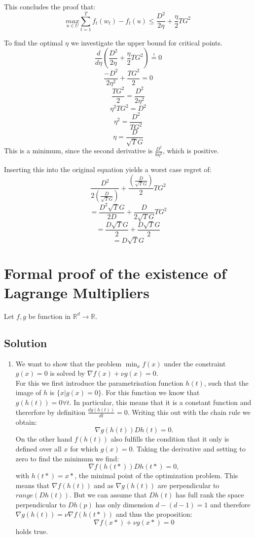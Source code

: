 \documentclass[10pt]{article}
\numberwithin{equation}{section}
\begin{document}
\begin{enumerate}
{This concludes the proof that:
$$\underset{u \in U}{max} \sum_{t=1}^T f_t(w_t) - f_t(u) \leq  \frac{D^2}{2\eta} + \frac{\eta}{2} T G^2$$

\item[d)]{
    To find the optimal $\eta$ we investigate the upper bound for critical points.
    $$ \frac{d}{d \eta} \left( \frac{D^2}{2\eta} + \frac{\eta}{2} T G^2\right)  \overset{!}{=} 0$$
    $$\frac{-D^2}{2\eta^2} + \frac{TG^2}{2} = 0 $$
    $$\frac{TG^2}{2} = \frac{D^2}{2\eta^2}  $$
    $$\eta^2TG^2 = D^2$$
    $$\eta^2 = \frac{D^2}{TG^2}$$
    $$\eta = \frac{D}{\sqrt{T}G}$$
    This is a minimum, since the second derivative is $\frac{D^2}{6\eta^3}$, which is positive.

    Inserting this into the original equation yields a worst case regret of:
    $$\frac{D^2}{2\left(\frac{D}{\sqrt{T}{G}}\right)} + \frac{\left(\frac{D}{\sqrt{T}G}\right)}{2} T G^2$$
    $$=\frac{D^2\sqrt{T}G}{2D} + \frac{D}{2\sqrt{T}G} T G^2$$
    $$=\frac{D\sqrt{T}G}{2} + \frac{D\sqrt{T}G}{2}$$
    $$=D\sqrt{T}G$$
  }
    


}
\end{enumerate}
\section*{Formal proof of the existence of Lagrange Multipliers}
Let $f, g$ be function in $ \mathbb{R}^d \to \mathbb{R}$. 
\subsection*{Solution}
\begin{enumerate}
\item
We want to show that the problem $\min_x f(x)$ under the constraint $g(x)=0$ is solved by $\nabla f(x) + \nu g(x) =0$. \\
For this we first introduce the parametrisation function $h(t)$, such that the image of $h$ is $\{x|g(x) = 0\}$. 
For this function we know that $g(h(t)) = 0 \forall t$. In particular, this means that it is a constant function and thererfore by definition $\frac{dg(h(t))}{dt} = 0$. Writing this out with the chain rule we obtain:
$$
\nabla g(h(t)) Dh(t) = 0.
$$
On the other hand $f(h(t))$ also fulfills the condition that it only is defined over all $x$ for which $g(x)=0$. Taking the derivative and setting to zero to find the minimum we find:
$$
\nabla f(h(t*)) Dh(t*) = 0,
$$
with $h(t*) = x*$, the minimal point of the optimization problem. 
This means that $\nabla f(h(t))$ and as $\nabla g(h(t))$ are perpendicular to $range(Dh(t))$. But we can assume that $Dh(t)$ has full rank the space perpendicular to $Dh(p)$ has only dimension $d-(d-1) = 1$ and therefore $\nabla g(h(t)) = \nu \nabla f(h(t*))$ and thus the proposition:
$$
\nabla f(x*) + \nu g(x*) =0
$$
holds true. 
\end{enumerate}
\end{document}

